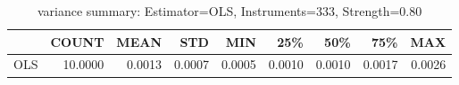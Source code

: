 \begin{table}[ht]
\centering
\caption{variance summary: Estimator=OLS, Instruments=333, Strength=0.80}
\begin{tabular}{lrrrrrrrr}
\toprule
 & COUNT & MEAN & STD & MIN & 25\% & 50\% & 75\% & MAX \\
\midrule
OLS & 10.0000 & 0.0013 & 0.0007 & 0.0005 & 0.0010 & 0.0010 & 0.0017 & 0.0026 \\
\bottomrule
\end{tabular}
\end{table}
